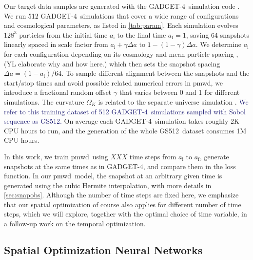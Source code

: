 \documentclass[modern, trackchanges, dvipsnames]{aastex631}
\newcommand{\pmwd}{{\usefont{T1}{nova}{m}{sl}pmwd}}
\newcommand{\GADGET}{{{\fontsize{10pt}{12pt}\selectfont GADGET}-4}}
\newcommand{\GSDATA}{{GS512}}
\newcommand{\OmegaK}{\Omega_K}
\newcommand{\ic}{\mathrm{i}}
\newcommand{\f}{\mathrm{f}}
\newcommand{\YL}[1]{\textcolor{Bittersweet}{#1}}
\newcommand{\YZ}[1]{\textcolor{MidnightBlue}{#1}}
\begin{document}
Our target data samples are generated with the \GADGET\ simulation code
\citep{GADGET-4}.
We run 512 \GADGET\ simulations that cover a wide range of
configurations and cosmological parameters, as listed in
\autoref{tab:param}.
\YL{
Each simulation evolves $128^3$ particles from the initial time $a_\ic$
to the final time $a_\f=1$, saving 64 snapshots linearly spaced in scale
factor from $a_\ic + \gamma \Delta a$ to $1 - (1 - \gamma) \Delta a$.
We determine $a_\ic$ for each configuration depending on its cosmology
and mean particle spacing \citep{MichauxEtAl2021}, \YL{(YL elaborate why
and how here.)} which then sets the snapshot spacing $\Delta a = (1 -
a_\ic) / 64$.
To sample different alignment between the snapshots and the start/stop
times and avoid possible related numerical errors in \pmwd, we introduce
a fractional random offset $\gamma$ that varies between 0 and 1 for
different simulations.
}
The curvature $\OmegaK$ is related to the separate universe simulation
\citep{LiEtAl2014, WagnerEtAl2015}.
\YZ{We refer to this training dataset of 512 \GADGET\ simulations
sampled with Sobol sequence as \GSDATA.}
On average each \GADGET\ simulation takes roughly 2K CPU hours to run,
and the generation of the whole \GSDATA\ dataset consumes 1M CPU hours.

\YL{
In this work, we train \pmwd\ using $XXX$ time steps from $a_\ic$ to
$a_\f$, generate snapshots at the same times as in \GADGET, and compare
them in the loss function.}
In our \pmwd\ model, the snapshot at an arbitrary given time is
generated using the cubic Hermite interpolation, with more details in
\autoref{sec:snapobs}.
\YL{Although the number of time steps are fixed here, we emphasize that
our spatial optimization of course also applies for different number of
time steps, which we will explore, together with the optimal choice of
time variable, in a follow-up work on the temporal optimization.
}


\subsection{Spatial Optimization Neural Networks}
\end{document}
